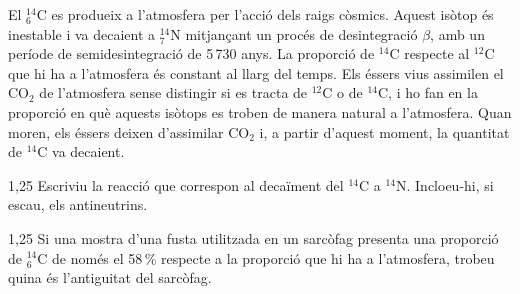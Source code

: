 El ${}^{14}_{6}\mathrm{C}$ es produeix a l'atmosfera per l'acció dels raigs còsmics. Aquest isòtop és inestable i va decaient a ${}^{14}_{7}\mathrm{N}$ mitjançant un procés de desintegració $\beta$, amb un període de semidesintegració de 5\,730 anys. La proporció de ${}^{14}\mathrm{C}$ respecte al ${}^{12}\mathrm{C}$ que hi ha a l'atmosfera és constant al llarg del temps. Els éssers vius assimilen el CO$_2$ de l'atmosfera sense distingir si es tracta de ${}^{12}\mathrm{C}$ o de ${}^{14}\mathrm{C}$, i ho fan en la proporció en què aquests isòtops es troben de manera natural a l'atmosfera. Quan moren, els éssers deixen d'assimilar CO$_2$ i, a partir d'aquest moment, la quantitat de ${}^{14}\mathrm{C}$ va decaient.

\begin{apartat}{1,25}
Escriviu la reacció que correspon al decaïment del ${}^{14}\mathrm{C}$ a ${}^{14}\mathrm{N}$. Incloeu-hi, si escau, els antineutrins.
\end{apartat}

\begin{apartat}{1,25}
Si una mostra d'una fusta utilitzada en un sarcòfag presenta una proporció de ${}^{14}_{6}\mathrm{C}$ de només el 58\,\% respecte a la proporció que hi ha a l'atmosfera, trobeu quina és l'antiguitat del sarcòfag.
\end{apartat}
